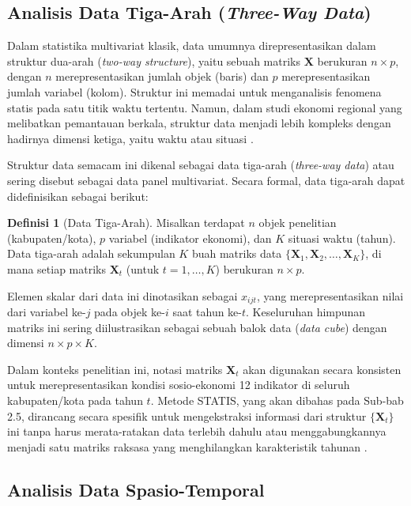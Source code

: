 \documentclass[a4paper]{article}
\theoremstyle{definition} %
\newtheorem{definition}{Definisi}[section]
\begin{document}
\subsection{Analisis Data Tiga-Arah (\textit{Three-Way Data})}

Dalam statistika multivariat klasik, data umumnya direpresentasikan dalam struktur dua-arah (\textit{two-way structure}), yaitu sebuah matriks $\mathbf{X}$ berukuran $n \times p$, dengan $n$ merepresentasikan jumlah objek (baris) dan $p$ merepresentasikan jumlah variabel (kolom). Struktur ini memadai untuk menganalisis fenomena statis pada satu titik waktu tertentu. Namun, dalam studi ekonomi regional yang melibatkan pemantauan berkala, struktur data menjadi lebih kompleks dengan hadirnya dimensi ketiga, yaitu waktu atau situasi \citep{kroonenberg2008}.

Struktur data semacam ini dikenal sebagai data tiga-arah (\textit{three-way data}) atau sering disebut sebagai data panel multivariat. Secara formal, data tiga-arah dapat didefinisikan sebagai berikut:

\begin{definition}[Data Tiga-Arah]
	Misalkan terdapat $n$ objek penelitian (kabupaten/kota), $p$ variabel (indikator ekonomi), dan $K$ situasi waktu (tahun). Data tiga-arah adalah sekumpulan $K$ buah matriks data $\{\mathbf{X}_1, \mathbf{X}_2, \dots, \mathbf{X}_K\}$, di mana setiap matriks $\mathbf{X}_t$ (untuk $t=1, \dots, K$) berukuran $n \times p$.
	
	Elemen skalar dari data ini dinotasikan sebagai $x_{ijt}$, yang merepresentasikan nilai dari variabel ke-$j$ pada objek ke-$i$ saat tahun ke-$t$. Keseluruhan himpunan matriks ini sering diilustrasikan sebagai sebuah balok data (\textit{data cube}) dengan dimensi $n \times p \times K$.
\end{definition}

Dalam konteks penelitian ini, notasi matriks $\mathbf{X}_t$ akan digunakan secara konsisten untuk merepresentasikan kondisi sosio-ekonomi 12 indikator di seluruh kabupaten/kota pada tahun $t$. Metode STATIS, yang akan dibahas pada Sub-bab 2.5, dirancang secara spesifik untuk mengekstraksi informasi dari struktur $\{\mathbf{X}_t\}$ ini tanpa harus merata-ratakan data terlebih dahulu atau menggabungkannya menjadi satu matriks raksasa yang menghilangkan karakteristik tahunan \citep{lavit94}.

\subsection{Analisis Data Spasio-Temporal}
\end{document}
